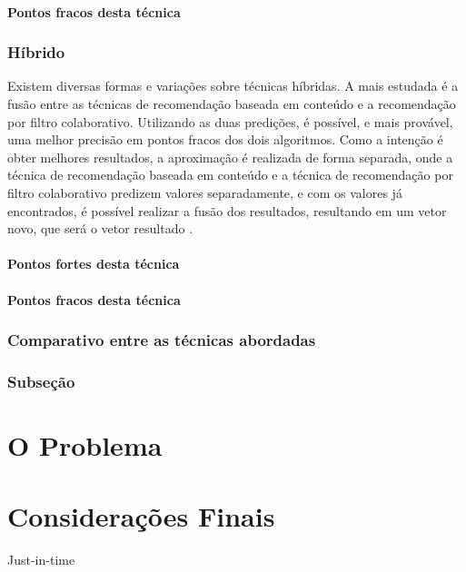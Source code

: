 \documentclass[12pt,
				openright,
				twoside,
				a4paper,
				apter=TITLE,
				section=TITLE,
				subsection=TITLE,
				chapter=TITLE,
				english,
				brazil]{abntex2}
\begin{document}
\subsubsection{Pontos fracos desta técnica}


\subsection{Híbrido}
Existem diversas formas e variações sobre técnicas híbridas. A mais estudada é a fusão entre as técnicas de recomendação baseada em conteúdo e a recomendação por filtro colaborativo. Utilizando as duas predições, é possível, e mais provável, uma melhor precisão em pontos fracos dos dois algoritmos. Como a intenção é obter melhores resultados, a aproximação é realizada de forma separada, onde a técnica de recomendação baseada em conteúdo e a técnica de recomendação por filtro colaborativo predizem valores separadamente, e com os valores já encontrados, é possível realizar a fusão dos resultados, resultando em um vetor novo, que será o vetor resultado \cite{melville2010recommender}.

\subsubsection{Pontos fortes desta técnica}

\subsubsection{Pontos fracos desta técnica}

\subsection{Comparativo entre as técnicas abordadas}



\subsection{Subseção}


\chapter{O Problema}
\chapter{Considerações Finais}
Just-in-time



\end{document}
